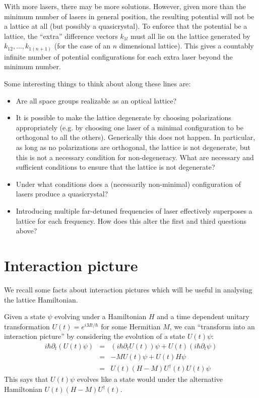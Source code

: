 \documentclass[aps,prb,floatfix,amsmath,amssymb,groupedaddress]{revtex4}
\begin{document}
With more lasers, there may be more solutions.  However, given more than the minimum number of lasers in general position, the resulting potential will not be a lattice at all (but possibly a quasicrystal).  To enforce that the potential be a lattice, the ``extra'' difference vectors $k_{1l}$ must all lie on the lattice generated by $k_{12},\dots,k_{1(n+1)}$ (for the case of an $n$ dimensional lattice).  This gives a countably infinite number of potential configurations for each extra laser beyond the minimum number. 

Some interesting things to think about along these lines are: 
\begin{itemize}
\item Are all space groups realizable as an optical lattice?
\item It is possible to make the lattice degenerate by choosing polarizations appropriately (e.g. by choosing one laser of a minimal configuration to be orthogonal to all the others).  Generically this does not happen.  In particular, as long as no polarizations are orthogonal, the lattice is not degenerate, but this is not a necessary condition for non-degeneracy.  What are necessary and sufficient conditions to ensure that the lattice is not degenerate?
\item Under what conditions does a (necessarily non-minimal) configuration of lasers produce a quasicrystal?
\item Introducing multiple far-detuned frequencies of laser effectively superposes a lattice for each frequency.  How does this alter the first and third questions above?
\end{itemize}

\section{Interaction picture} %
We recall some facts about interaction pictures which will be useful in analysing the lattice Hamiltonian.

Given a state $\psi$ evolving under a Hamiltonian $H$ and a time dependent unitary transformation $U(t) = e^{i M t/\hbar}$ for some Hermitian $M$, we can ``transform into an interaction picture'' by considering the evolution of a state $U(t) \psi$:
\begin{eqnarray*}
i\hbar\partial_t \left(U(t) \psi\right) & = & \left(i\hbar\partial_t U(t)\right) \psi + U(t) \left(i\hbar\partial_t \psi\right) \\
& = & - M U(t) \psi + U(t) H \psi \\
& = & U(t) \left(H-M\right)U^\dagger(t) U(t)\psi
\end{eqnarray*}
This says that $U(t)\psi$ evolves like a state would under the alternative Hamiltonian $U(t) \left(H-M\right)U^\dagger(t)$.  
\end{document}
